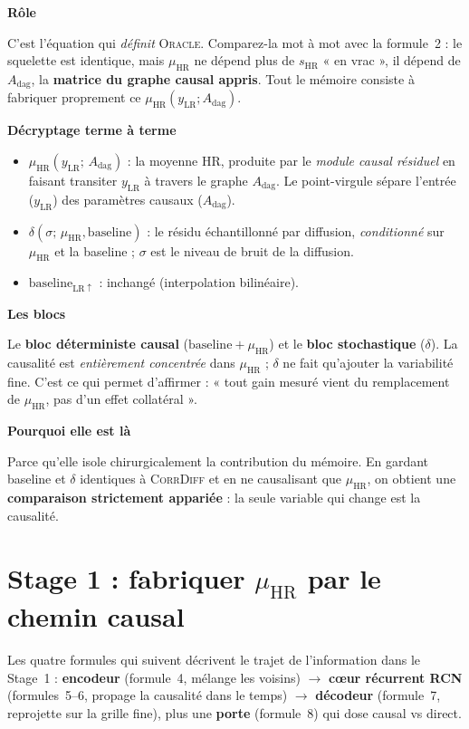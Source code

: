 \documentclass[11pt,a4paper]{article}
\newcommand{\Oracle}{\textsc{Oracle}}
\newcommand{\CorrDiff}{\textsc{CorrDiff}}
\newcommand{\LR}{\ensuremath{\mathrm{LR}}}
\newcommand{\HR}{\ensuremath{\mathrm{HR}}}
\newcommand{\yLR}{\ensuremath{y_{\LR}}}
\newcommand{\muHR}{\ensuremath{\mu_{\HR}}}
\newcommand{\Adag}{\ensuremath{A_{\mathrm{dag}}}}
\newcommand{\bloc}[1]{\par\medskip\noindent\textcolor{accent}{\textbf{#1}}\par\nopagebreak\smallskip}
\begin{document}
\bloc{Rôle}
C'est l'équation qui \emph{définit} \Oracle{}. Comparez-la mot à mot avec la formule~2 : le squelette est identique, mais $\muHR$ ne dépend plus de $s_{\HR}$ « en vrac », il dépend de $\Adag$, la \textbf{matrice du graphe causal appris}. Tout le mémoire consiste à fabriquer proprement ce $\muHR(\yLR; \Adag)$.

\bloc{Décryptage terme à terme}
\begin{itemize}[nosep]
  \item $\muHR(\yLR;\, \Adag)$ : la moyenne HR, produite par le \emph{module causal résiduel} en faisant transiter $\yLR$ à travers le graphe $\Adag$. Le point-virgule sépare l'entrée ($\yLR$) des paramètres causaux ($\Adag$).
  \item $\delta(\sigma;\, \muHR, \mathrm{baseline})$ : le résidu échantillonné par diffusion, \emph{conditionné} sur $\muHR$ et la baseline ; $\sigma$ est le niveau de bruit de la diffusion.
  \item $\mathrm{baseline}_{\LR\uparrow}$ : inchangé (interpolation bilinéaire).
\end{itemize}

\bloc{Les blocs}
Le \textbf{bloc déterministe causal} ($\mathrm{baseline} + \muHR$) et le \textbf{bloc stochastique} ($\delta$). La causalité est \emph{entièrement concentrée} dans $\muHR$ ; $\delta$ ne fait qu'ajouter la variabilité fine. C'est ce qui permet d'affirmer : « tout gain mesuré vient du remplacement de $\muHR$, pas d'un effet collatéral ».

\bloc{Pourquoi elle est là}
Parce qu'elle isole chirurgicalement la contribution du mémoire. En gardant baseline et $\delta$ identiques à \CorrDiff{} et en ne causalisant que $\muHR$, on obtient une \textbf{comparaison strictement appariée} : la seule variable qui change est la causalité.

\section{Stage 1 : fabriquer \texorpdfstring{$\muHR$}{mu\_HR} par le chemin causal}

\begin{mdframed}[backgroundcolor=grisclair,linecolor=vert,linewidth=0.6pt,roundcorner=3pt]
Les quatre formules qui suivent décrivent le trajet de l'information dans le Stage~1 : \textbf{encodeur} (formule~4, mélange les voisins) $\to$ \textbf{c\oe ur récurrent RCN} (formules~5--6, propage la causalité dans le temps) $\to$ \textbf{décodeur} (formule~7, reprojette sur la grille fine), plus une \textbf{porte} (formule~8) qui dose causal vs direct.
\end{mdframed}
\end{document}
